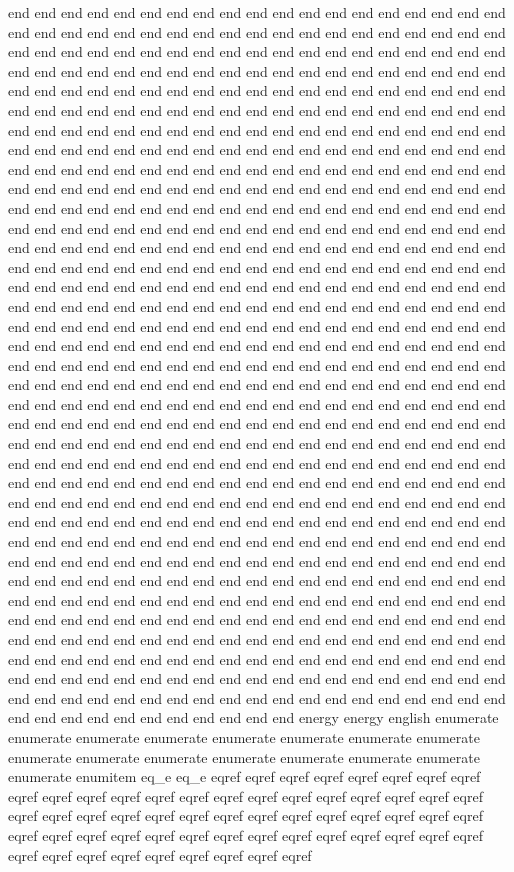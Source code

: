 end end end end end end end end end end end end end end end end end end end end end end end end end end end end end end end end end end end end end end end end end end end end end end end end end end end end end end end end end end end end end end end end end end end end end end end end end end end end end end end end end end end end end end end end end end end end end end end end end end end end end end end end end end end end end end end end end end end end end end end end end end end end end end end end end end end end end end end end end end end end end end end end end end end end end end end end end end end end end end end end end end end end end end end end end end end end end end end end end end end end end end end end end end end end end end end end end end end end end end end end end end end end end end end end end end end end end end end end end end end end end end end end end end end end end end end end end end end end end end end end end end end end end end end end end end end end end end end end end end end end end end end end end end end end end end end end end end end end end end end end end end end end end end end end end end end end end end end end end end end end end end end end end end end end end end end end end end end end end end end end end end end end end end end end end end end end end end end end end end end end end end end end end end end end end end end end end end end end end end end end end end end end end end end end end end end end end end end end end end end end end end end end end end end end end end end end end end end end end end end end end end end end end end end end end end end end end end end end end end end end end end end end end end end end end end end end end end end end end end end end end end end end end end end end end end end end end end end end end end end end end end end end end end end end end end end end end end end end end end end end end end end end end end end end end end end end end end end end end end end end end end end end end end end end end end end end end end end end end end end end end end end end end end end end end end end end end end end end end end end end end end end end end end end end end end end end end end end end end end end end end end end end end end end end end end end end end end end end end end end end end end end end end end end end end end end end end end end end end end end end end end end end end end end end end end end end end end end end end end end end end end end end end end end end end end end end end end end end end end end end end end end end end end end end end end end end end end end end end end end end end end end end end end end end end end end end end end end end end end end end end end end end end end end end end end end end end end end energy energy english enumerate enumerate enumerate enumerate enumerate enumerate enumerate enumerate enumerate enumerate enumerate enumerate enumerate enumerate enumerate enumerate enumitem eq_e eq_e eqref eqref eqref eqref eqref eqref eqref eqref eqref eqref eqref eqref eqref eqref eqref eqref eqref eqref eqref eqref eqref eqref eqref eqref eqref eqref eqref eqref eqref eqref eqref eqref eqref eqref eqref eqref eqref eqref eqref eqref eqref eqref eqref eqref eqref eqref eqref eqref eqref eqref eqref eqref eqref eqref eqref eqref eqref eqref eqref 